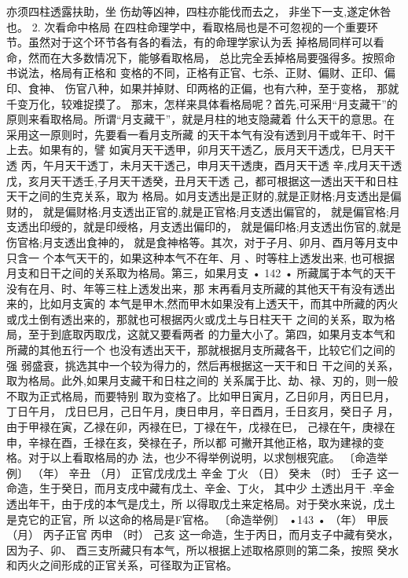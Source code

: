 亦须四柱透露扶助，坐 伤劫等凶神，四柱亦能伐而去之，
非坐下一支,遂定休咎也。
2. 次看命中格局
在四柱命理学中，看取格局也是不可忽视的一个重要环
节。虽然对于这个环节各有各的看法，有的命理学家认为丢
掉格局同样可以看命，然而在大多数情况下，能够看取格局，
总比完全丢掉格局要强得多。按照命书说法，格局有正格和
变格的不同，正格有正官、七杀、正财、偏财、正印、偏印、食神、
伤官八种，如果并掉财、印两格的正偏，也有六种，至于变格，
那就千变万化，较难捉摸了。
那末，怎样来具体看格局呢？首先,可采用“月支藏干”的
原则来看取格局。所谓“月支藏干”，就是月柱的地支隐藏着
什么天干的意思。在采用这一原则时，先要看一看月支所藏
的天干本气有没有透到月干或年干、时干上去。如果有的，譬
如寅月天干透甲，卯月天干透乙，辰月天干透戊，巳月天干透
丙，午月天干透丁，未月天干透己，申月天干透庚，酉月天干透
辛,戌月天干透戊，亥月天干透壬,子月天干透癸，丑月天干透
己，都可根据这一透出天干和日柱天干之间的生克关系，取为
格局。如月支透出是正财的,就是正财格;月支透出是偏财的，
就是偏财格;月支透出正官的,就是正官格;月支透出偏官的，
就是偏官格;月支透出印绶的，就是印绶格，月支透出偏印的，
就是偏印格;月支透出伤官的,就是伤官格;月支透出食神的，
就是食神格等。其次，对于子月、卯月、酉月等月支中只含一
个本气天干的，如果这种本气不在年、月 、时等柱上透发出来,
也可根据月支和日干之间的关系取为格局。第三，如果月支
• 142 •
所藏属于本气的天干没有在月、时、年等三柱上透发出来，那
末再看月支所藏的其他天干有没有透出来的，比如月支寅的
本气是甲木,然而甲木如果没有上透天干，而其中所藏的丙火
或戊土倒有透出来的，那就也可根据丙火或戊土与日柱天干
之间的关系，取为格局，至于到底取丙取戊，这就又要看两者
的力量大小了。第四，如果月支本气和所藏的其他五行一个
也没有透出天干，那就根据月支所藏各干，比较它们之间的强
弱盛衰，挑选其中一个较为得力的，然后再根据这一天干和日
干之间的关系，取为格局。此外,如果月支藏干和日柱之间的
关系属于比、劫、禄、刃的，则一般不取为正式格局，而要特别
取为变格了。比如甲日寅月，乙日卯月，丙日巳月，丁日午月，
戊日巳月，己日午月，庚日申月，辛日酉月，壬日亥月，癸日子
月，由于甲禄在寅，乙禄在卯，丙禄在巳，丁禄在午，戊禄在巳，
己禄在午，庚禄在申，辛禄在酉，壬禄在亥，癸禄在子，所以都
可撇开其他正格，取为建禄的变格。对于以上看取格局的办
法，也少不得举例说明，以求刨根究底。
〔命造举例〕
（年） 辛丑
（月） 正官戊戌戊土 辛金 丁火
（日） 癸未
（时） 壬子
这一命造，生于癸日，而月支戌中藏有戊土、辛金、丁火，
其中少 土透出月干 .辛金透出年干，由于戌的本气是戊土，所
以得取戊土来定格局。对于癸水来说，戊土是克它的正官，所
以这命的格局是F官格。
〔命造举例〕
•143 •
（年） 甲辰
（月） 丙子正官
丙申
（时） 己亥
这一命造，生于丙日，而月支子中藏有癸水，因为子、卯、
酉三支所藏只有本气，所以根据上述取格原则的第二条，按照
癸水和丙火之间形成的正官关系，可径取为正官格。
